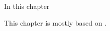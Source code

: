 \label{chap:confluent}
\minitoc\mtcskip

\noindent 
In this chapter 

This chapter is mostly based on \textcite{Tricomi:1954,Tricomi:1962}.

